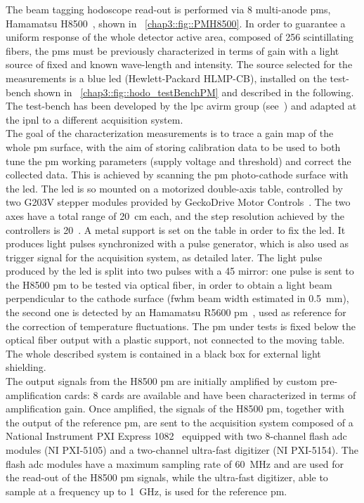The beam tagging hodoscope read-out is performed via 8 multi-anode \glspl{pm}, Hamamatsu H8500~\parencite{Hamamatsu2006}, shown in \figurename~\ref{chap3::fig::PMH8500}. In order to guarantee a uniform response of the whole detector active area, composed of 256 scintillating fibers, the \glspl{pm} must be previously characterized in terms of gain with a light source of fixed and known wave-length and intensity. The source selected for the measurements is a blue \gls{led} (Hewlett-Packard HLMP-CB), installed on the test-bench shown in \figurename~\ref{chap3::fig::hodo_testBenchPM} and described in the following. The test-bench has been developed by the \gls{lpc} \gls{avirm} group (see~\cite{Gaglione2013}) and adapted at the \gls{ipnl} to a different acquisition system.\\
The goal of the characterization measurements is to trace a gain map of the whole \gls{pm} surface, with the aim of storing calibration data to be used to both tune the \gls{pm} working parameters (supply voltage and threshold) and correct the collected data. This is achieved by scanning the \gls{pm} photo-cathode surface with the \gls{led}. The \gls{led} is so mounted on a motorized double-axis table, controlled by two G203V stepper modules provided by GeckoDrive Motor Controls~\parencite{GeckoDrive2010}. The two axes have a total range of 20~cm each, and the step resolution achieved by the controllers is 20~\charmum. A metal support is set on the table in order to fix the \gls{led}. It produces light pulses synchronized with a pulse generator, which is also used as trigger signal for the acquisition system, as detailed later. The light pulse produced by the \gls{led} is split into two pulses with a 45\textdegree{} mirror: one pulse is sent to the H8500 \gls{pm} to be tested via optical fiber, in order to obtain a light beam perpendicular to the cathode surface (\gls{fwhm} beam width estimated in 0.5~mm), the second one is detected by an Hamamatsu R5600 \gls{pm}~\parencite{Hamamatsu1995}, used as reference for the correction of temperature fluctuations. The \gls{pm} under tests is fixed below the optical fiber output with a plastic support, not connected to the moving table. The whole described system is contained in a black box for external light shielding.\\
The output signals from the H8500 \gls{pm} are initially amplified by custom pre-amplification cards: 8 cards are available and have been characterized in terms of amplification gain. Once amplified, the signals of the H8500 \gls{pm}, together with the output of the reference \gls{pm}, are sent to the acquisition system composed of a National Instrument PXI Express 1082~\parencite{NationalInstruments2010} equipped with two 8-channel flash \gls{adc} modules (NI PXI-5105) and a two-channel ultra-fast digitizer (NI PXI-5154). The flash \gls{adc} modules have a maximum sampling rate of 60~MHz and are used for the read-out of the H8500 \gls{pm} signals, while the ultra-fast digitizer, able to sample at a frequency up to 1~GHz, is used for the reference \gls{pm}.\\
